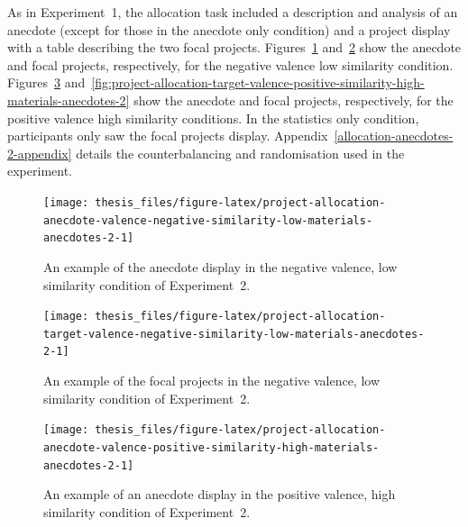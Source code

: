 \documentclass[a4paper, nobind, dvipsnames]{templates/ociamthesis}
\theoremstyle{definition}
\theoremstyle{definition}
\theoremstyle{definition}
\theoremstyle{definition}
\theoremstyle{remark}
\begin{document}
As in Experiment~1, the allocation task included a description and analysis of
an anecdote (except for those in the anecdote only condition) and a project
display with a table describing the two focal projects.
Figures~\ref{fig:project-allocation-anecdote-valence-negative-similarity-low-materials-anecdotes-2}
and~\ref{fig:project-allocation-target-valence-negative-similarity-low-materials-anecdotes-2}
show the anecdote and focal projects, respectively, for the negative valence
low similarity condition.
Figures~\ref{fig:project-allocation-anecdote-valence-positive-similarity-high-materials-anecdotes-2}
and~\ref{fig:project-allocation-target-valence-positive-similarity-high-materials-anecdotes-2}
show the anecdote and focal projects, respectively, for the positive valence
high similarity conditions. In the statistics only condition, participants only
saw the focal projects display. Appendix~\ref{allocation-anecdotes-2-appendix}
details the counterbalancing and randomisation used in the experiment.



\begin{figure}
\texttt{[image: thesis\_files/figure-latex/project-allocation-anecdote-valence-negative-similarity-low-materials-anecdotes-2-1]} \caption{An example of the anecdote display in the negative valence, low similarity condition of Experiment~2.}\label{fig:project-allocation-anecdote-valence-negative-similarity-low-materials-anecdotes-2}
\end{figure}



\begin{figure}
\texttt{[image: thesis\_files/figure-latex/project-allocation-target-valence-negative-similarity-low-materials-anecdotes-2-1]} \caption{An example of the focal projects in the negative valence, low similarity condition of Experiment~2.}\label{fig:project-allocation-target-valence-negative-similarity-low-materials-anecdotes-2}
\end{figure}



\begin{figure}
\texttt{[image: thesis\_files/figure-latex/project-allocation-anecdote-valence-positive-similarity-high-materials-anecdotes-2-1]} \caption{An example of an anecdote display in the positive valence, high similarity condition of Experiment~2.}\label{fig:project-allocation-anecdote-valence-positive-similarity-high-materials-anecdotes-2}
\end{figure}
\end{document}
